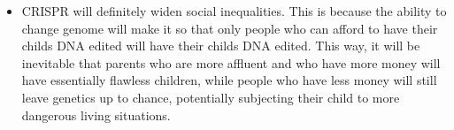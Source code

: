 \documentclass[letterpaper]{article}
\def\tightlist{}
\begin{document}
\begin{itemize}
\tightlist
\item
  CRISPR will definitely widen social inequalities. This is because the ability to change genome will make it so that only people who can afford to have their child\textquotesingle s DNA edited will have their child\textquotesingle s DNA edited. This way, it will be inevitable that parents who are more affluent and who have more money will have essentially flawless children, while people who have less money will still leave genetics up to chance, potentially subjecting their child to more dangerous living situations.
\end{itemize}
\end{document}
